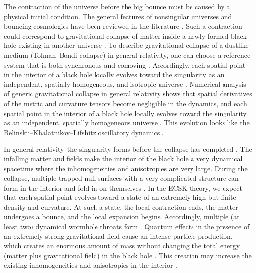 \documentclass[prd,onecolumn,nofootinbib]{revtex4}
\begin{document}
The contraction of the universe before the big bounce must be caused by a physical initial condition.
The general features of nonsingular universes and bouncing cosmologies have been reviewed in the literature \cite{prop}.
Such a contraction could correspond to gravitational collapse of matter inside a newly formed black hole existing in another universe \cite{torsion1,Pat}.
To describe gravitational collapse of a dustlike medium (Tolman--Bondi collapse) in general relativity, one can choose a reference system that is both synchronous and comoving \cite{LL2}.
Accordingly, each spatial point in the interior of a black hole locally evolves toward the singularity as an independent, spatially homogeneous, and isotropic universe \cite{Lor,LL2}.
Numerical analysis of generic gravitational collapse in general relativity shows that spatial derivatives of the metric and curvature tensors become negligible in the dynamics, and each spatial point in the interior of a black hole locally evolves toward the singularity as an independent, spatially homogeneous universe \cite{num}.
This evolution looks like the Belinskii--Khalatnikov--Lifshitz oscillatory dynamics \cite{BKL}.

In general relativity, the singularity forms before the collapse has completed \cite{LL2,HoVi}.
The infalling matter and fields make the interior of the black hole a very dynamical spacetime where the inhomogeneities and anisotropies are very large.
During the collapse, multiple trapped null surfaces with a very complicated structure can form in the interior and fold in on themselves \cite{HoVi}.
In the ECSK theory, we expect that each spatial point evolves toward a state of an extremely high but finite density and curvature.
At such a state, the local contraction ends, the matter undergoes a bounce, and the local expansion begins.
Accordingly, multiple (at least two) dynamical wormhole throats form \cite{HoVi}.
Quantum effects in the presence of an extremely strong gravitational field cause an intense particle production, which creates an enormous amount of mass \cite{Zel} without changing the total energy (matter plus gravitational field) in the black hole \cite{torsion4}.
This creation may increase the existing inhomogeneities and anisotropies in the interior \cite{tech}.
\end{document}
